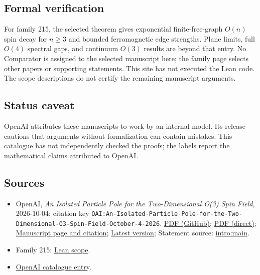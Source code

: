 \documentclass[11pt]{article}
\begin{document}
\subsection{Formal verification}
For family 215, the selected theorem gives exponential finite-free-graph $O(n)$ spin decay for $n\geq3$ and bounded ferromagnetic edge strengths. Plane limits, full $O(4)$ spectral gaps, and continuum $O(3)$ results are beyond that entry. No Comparator is assigned to the selected manuscript here; the family page selects other papers or supporting statements. This site has not executed the Lean code. The scope descriptions do not certify the remaining manuscript arguments.

\subsection{Status caveat}
OpenAI attributes these manuscripts to work by an internal model. Its release cautions that arguments without formalization can contain mistakes. This catalogue has not independently checked the proofs; the labels report the mathematical claims attributed to OpenAI.

\subsection{Sources}
\begin{itemize}
\item OpenAI, \emph{An Isolated Particle Pole for the Two-Dimensional O(3) Spin Field}, 2026-10-04; citation key \texttt{OAI:An-Isolated-Particle-Pole-for-the-Two-Dimensional-O3-Spin-Field-October-4-2026}. \href{https://github.com/openai/math/blob/adc7f1241b42e322a6451854ab7e4b4c146bf78a/preprints/An-Isolated-Particle-Pole-for-the-Two-Dimensional-O3-Spin-Field-October-4-2026/o3-particle-pole.pdf}{PDF (GitHub)}; \href{https://github.com/openai/math/raw/adc7f1241b42e322a6451854ab7e4b4c146bf78a/preprints/An-Isolated-Particle-Pole-for-the-Two-Dimensional-O3-Spin-Field-October-4-2026/o3-particle-pole.pdf}{PDF (direct)}; \href{https://github.com/openai/math/blob/adc7f1241b42e322a6451854ab7e4b4c146bf78a/preprints/An-Isolated-Particle-Pole-for-the-Two-Dimensional-O3-Spin-Field-October-4-2026/README.md}{Manuscript page and citation}; \href{https://github.com/openai/math/blob/main/preprints/An-Isolated-Particle-Pole-for-the-Two-Dimensional-O3-Spin-Field-October-4-2026/o3-particle-pole.pdf}{Latest version}; Statement source: \href{https://github.com/openai/math/blob/adc7f1241b42e322a6451854ab7e4b4c146bf78a/preprints/An-Isolated-Particle-Pole-for-the-Two-Dimensional-O3-Spin-Field-October-4-2026/build/sections/01-introduction.tex\#L30}{intro:main}.
\item Family 215: \href{https://github.com/openai/math/blob/adc7f1241b42e322a6451854ab7e4b4c146bf78a/lean/docs/215.md}{Lean scope}.
\item \href{https://github.com/openai/math/blob/adc7f1241b42e322a6451854ab7e4b4c146bf78a/CONTENTS.md}{OpenAI catalogue entry}.
\end{itemize}
\end{document}
